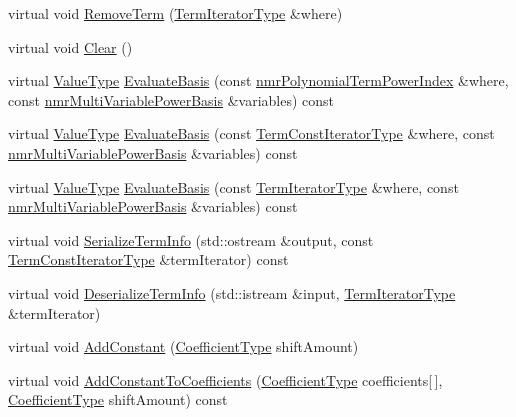 \begin{DoxyCompactItemize}
\item 
virtual void \hyperlink{classnmr_standard_polynomial_a0149f843c87d2082933b4d317f9ca69d}{Remove\+Term} (\hyperlink{classnmr_polynomial_container_a276e57445d038e8a16462f47b85719a3}{Term\+Iterator\+Type} \&where)
\item 
virtual void \hyperlink{classnmr_standard_polynomial_a7efcdc4097121d65de20dde2523e6525}{Clear} ()
\item 
virtual \hyperlink{classnmr_polynomial_base_a72f0bc16b225e4708bcf15a77ba206e3}{Value\+Type} \hyperlink{classnmr_standard_polynomial_adbcaa19b3060f8495fb5f9f73cca5018}{Evaluate\+Basis} (const \hyperlink{classnmr_polynomial_term_power_index}{nmr\+Polynomial\+Term\+Power\+Index} \&where, const \hyperlink{classnmr_multi_variable_power_basis}{nmr\+Multi\+Variable\+Power\+Basis} \&variables) const 
\item 
virtual \hyperlink{classnmr_polynomial_base_a72f0bc16b225e4708bcf15a77ba206e3}{Value\+Type} \hyperlink{classnmr_standard_polynomial_a28025454a47d7cc8d412e44ac0d32f8b}{Evaluate\+Basis} (const \hyperlink{classnmr_polynomial_container_aba8d31506ab6a487fdc4fe2815469442}{Term\+Const\+Iterator\+Type} \&where, const \hyperlink{classnmr_multi_variable_power_basis}{nmr\+Multi\+Variable\+Power\+Basis} \&variables) const 
\item 
virtual \hyperlink{classnmr_polynomial_base_a72f0bc16b225e4708bcf15a77ba206e3}{Value\+Type} \hyperlink{classnmr_standard_polynomial_a929583fdcc7461fef1086cab401a698d}{Evaluate\+Basis} (const \hyperlink{classnmr_polynomial_container_a276e57445d038e8a16462f47b85719a3}{Term\+Iterator\+Type} \&where, const \hyperlink{classnmr_multi_variable_power_basis}{nmr\+Multi\+Variable\+Power\+Basis} \&variables) const 
\item 
virtual void \hyperlink{classnmr_standard_polynomial_a5867b0d1cba13066228b8a8862feebfa}{Serialize\+Term\+Info} (std\+::ostream \&output, const \hyperlink{classnmr_polynomial_container_aba8d31506ab6a487fdc4fe2815469442}{Term\+Const\+Iterator\+Type} \&term\+Iterator) const 
\item 
virtual void \hyperlink{classnmr_standard_polynomial_ac4e1ca13a07cf587db161710a09f5fcb}{Deserialize\+Term\+Info} (std\+::istream \&input, \hyperlink{classnmr_polynomial_container_a276e57445d038e8a16462f47b85719a3}{Term\+Iterator\+Type} \&term\+Iterator)
\item 
virtual void \hyperlink{classnmr_standard_polynomial_adc5e1beae5c00ee4dcf3582a10c99ba5}{Add\+Constant} (\hyperlink{classnmr_polynomial_base_a8693efdfc8585ccb49abea69f74f3eef}{Coefficient\+Type} shift\+Amount)
\item 
virtual void \hyperlink{classnmr_standard_polynomial_a8b1737695f4eb49a0876fda6cb909795}{Add\+Constant\+To\+Coefficients} (\hyperlink{classnmr_polynomial_base_a8693efdfc8585ccb49abea69f74f3eef}{Coefficient\+Type} coefficients\mbox{[}$\,$\mbox{]}, \hyperlink{classnmr_polynomial_base_a8693efdfc8585ccb49abea69f74f3eef}{Coefficient\+Type} shift\+Amount) const 
\end{DoxyCompactItemize}
